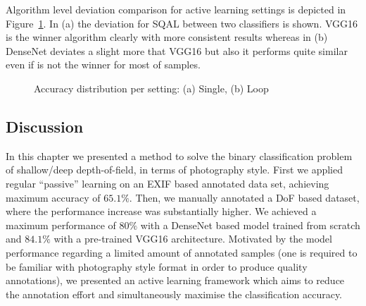 Algorithm level deviation comparison for active learning settings is depicted in Figure~\ref{c5:figure_acc_distribution_setting}. In (a) the deviation for SQAL between two classifiers is shown. VGG16 is the winner algorithm clearly with more consistent results whereas in (b) DenseNet deviates a slight more that VGG16 but also it performs quite similar even if is not the winner for most of samples.

\begin{figure}[ht!]
    \centering  
    \caption{Accuracy distribution per setting: (a) Single, (b) Loop}
    \label{c5:figure_acc_distribution_setting}
\end{figure}

\subsection{Discussion}

In this chapter we presented a method to solve the binary classification problem of shallow/deep depth-of-field, in terms of photography style. First we applied regular ``passive'' learning on an EXIF based annotated data set, achieving maximum accuracy of $65.1\%$.  
Then, we manually annotated a DoF based dataset, where the performance increase was substantially higher. We achieved a maximum performance of $80\%$ with a DenseNet based model trained from scratch and $84.1\%$ with a pre-trained VGG16 architecture.
Motivated by the model performance regarding a limited amount of annotated samples (one is required to be familiar with photography style format in order to produce quality annotations), we presented an active learning framework which aims to reduce the annotation effort and simultaneously maximise the classification accuracy.

